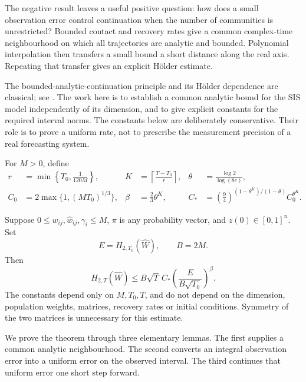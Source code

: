The negative result leaves a useful positive question: how does a small observation error control continuation when the number of communities is unrestricted? Bounded contact and recovery rates give a common complex-time neighbourhood on which all trajectories are analytic and bounded. Polynomial interpolation then transfers a small bound a short distance along the real axis. Repeating that transfer gives an explicit Hölder estimate.

The bounded-analytic-continuation principle and its Hölder dependence are classical; see \cite[Theorem 5.2 and Section 7]{T2020}. The work here is to establish a common analytic bound for the SIS model independently of its dimension, and to give explicit constants for the required interval norms. The constants below are deliberately conservative. Their role is to prove a uniform rate, not to prescribe the measurement precision of a real forecasting system.

For $M>0$, define
\begin{align}
 r&=\min\left\{T_0,\frac1{120M}\right\},
 &K&=\left\lceil\frac{T-T_0}{r}\right\rceil,
 &\theta&=\frac{\log2}{\log(8e)},\label{eq:holder-constants-a}\\
 C_0&=2\max\{1,(MT_0)^{1/3}\},
 &\beta&=\frac23\theta^K,
 &C_*&=\left(\frac94\right)^{(1-\theta^K)/(1-\theta)}C_0^{\theta^K}.
 \label{eq:holder-constants-b}
\end{align}

\begin{theorem}
\label{thm:holder-residual}
Suppose $0\leq w_{ij},\widehat w_{ij},\gamma_i\leq M$, $\pi$ is any probability vector, and $z(0)\in[0,1]^n$. Set
\[
 E=H_{2,T_0}(\widehat W),\qquad B=2M.
\]
Then
\begin{equation}
 H_{2,T}(\widehat W)
 \leq B\sqrt T\,C_*
 \left(\frac{E}{B\sqrt{T_0}}\right)^\beta.
 \label{eq:holder-residual}
\end{equation}
The constants depend only on $M,T_0,T$, and do not depend on the dimension, population weights, matrices, recovery rates or initial conditions. Symmetry of the two matrices is unnecessary for this estimate.
\end{theorem}

We prove the theorem through three elementary lemmas. The first supplies a common analytic neighbourhood. The second converts an integral observation error into a uniform error on the observed interval. The third continues that uniform error one short step forward.

